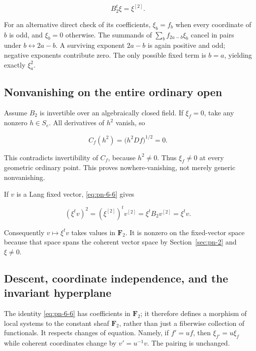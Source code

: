 \documentclass[11pt]{article}
\begin{document}
\begin{equation}
                             B_2^t\xi=\xi^{[2]}.                      \label{eq:pn-6-6}
\end{equation}

For an alternative direct check of its coefficients, \(\xi_b=f_b\)
when every coordinate of \(b\) is odd, and \(\xi_b=0\) otherwise.
The summands of \(\sum_b f_{2a-b}\xi_b\) cancel in pairs under
\(b\leftrightarrow2a-b\). A surviving exponent \(2a-b\) is again
positive and odd; negative exponents contribute zero. The only possible
fixed term is \(b=a\), yielding exactly \(\xi_a^2\).

\subsection{Nonvanishing on the entire ordinary open}

Assume \(B_2\) is invertible over an algebraically closed field. If
\(\xi_f=0\), take any nonzero \(h\in S_e\). All derivatives of \(h^2\)
vanish, so

\begin{equation}
                 C_f(h^2)=\bigl(h^2Df\bigr)^{1/2}=0.
\end{equation}

This contradicts invertibility of \(C_f\), because \(h^2\neq0\).
Thus \(\xi_f\neq0\) at every geometric ordinary point. This proves
nowhere-vanishing, not merely generic nonvanishing.

If \(v\) is a Lang fixed vector, \eqref{eq:pn-6-6} gives

\begin{equation}
 (\xi^tv)^2=(\xi^{[2]})^tv^{[2]}
           =\xi^t B_2v^{[2]}=\xi^tv.
\end{equation}

Consequently \(v\mapsto\xi^tv\) takes values in \(\mathbf F_2\).
It is nonzero on the fixed-vector space because that space spans the
coherent vector space by Section~\ref{sec:pn-2} and \(\xi\neq0\).

\subsection{Descent, coordinate independence, and the invariant hyperplane}

The identity \eqref{eq:pn-6-6} has coefficients in \(\mathbf F_2\); it therefore defines
a morphism of local systems to the constant sheaf \(\mathbf F_2\), rather
than just a fiberwise collection of functionals. It respects changes of
equation. Namely, if \(f'=uf\), then \(\xi_{f'}=u\xi_f\) while coherent
coordinates change by \(v'=u^{-1}v\). The pairing is unchanged.
\end{document}

